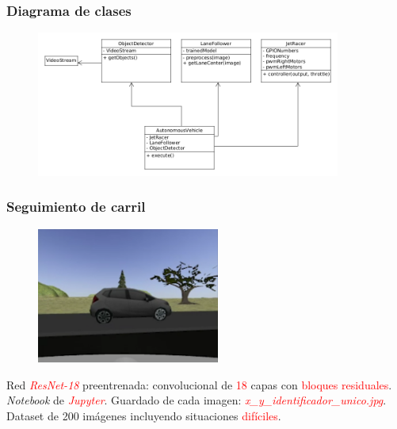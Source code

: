 \documentclass{beamer}
\begin{document}
\begin{frame}
	\frametitle{Diagrama de clases}
	\begin{figure}
		\centering
		\includegraphics[width=10cm]{figs/diagram6}
	\end{figure}
\end{frame}

\begin{frame}
	\frametitle{Seguimiento de carril}
	\begin{figure}
		\centering
		\includegraphics[width=6cm]{figs/trainedDifficult}
	\end{figure}
	\begin{outline}
		\1 Red \textcolor{red}{\textit{ResNet-18}} preentrenada: convolucional de \textcolor{red}{18} capas con \textcolor{red}{bloques residuales}.
		\1 \textit{Notebook} de \textcolor{red}{\textit{Jupyter}}.
		\1 Guardado de cada imagen: \textcolor{red}{\textit{x\_y\_identificador\_unico.jpg}}.
		\1 Dataset de 200 imágenes incluyendo situaciones \textcolor{red}{difíciles}.
	\end{outline}
\end{frame}
\end{document}
